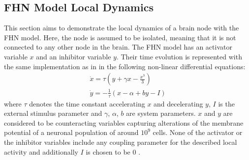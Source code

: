 \subsection{FHN Model Local Dynamics}

This section aims to demonstrate the local dynamics of a brain node with the FHN model. Here, the node is assumed to be isolated, meaning that it is not connected to any other node in the brain. The FHN model has an activator variable $x$ and an inhibitor variable $y$. Their time evolution is represented with the same implementation as in \citep{GHO08, GHO08a} in the following non-linear differential equations:
\begin{subequations}
\begin{align}\dot{x} = \tau (y + \gamma x - \frac{x^3}{3})  \label{eqn: frobenius 1}\\  \dot{y} = -\frac{1}{\tau} (x - \alpha + b y - I ) \label{eqn: frobenius 2}   \end{align} 
\end{subequations}
where $\tau$ denotes the time constant accelerating $x$ and decelerating $y$, $I$ is the external stimulus parameter and $\gamma$, $\alpha$, $b$ are system parameters. $x$ and $y$ are considered to be counteracting variables capturing alterations of the membrane potential of a neuronal population of around $10^9$ cells. None of the activator or the inhibitor variables include any coupling parameter for the described local activity and additionally $I$ is chosen to be 0 \citep{GHO08}.

